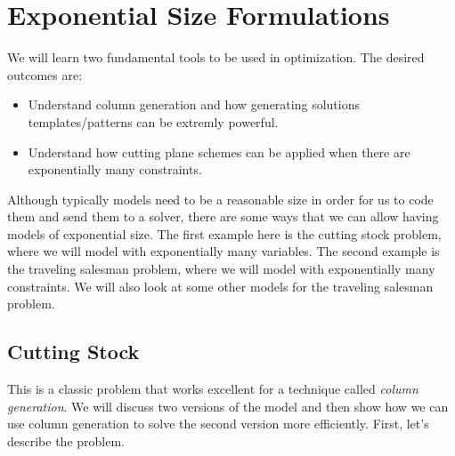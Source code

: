 
%

\chapter{Exponential Size Formulations}
\label{sec:exponential-IP-forumulations}

\begin{outcome}
We will learn two fundamental tools to be used in optimization.  The desired outcomes are:
\begin{itemize}
\item Understand column generation and how generating solutions templates/patterns can be extremly powerful.
\item Understand how cutting plane schemes can be applied when there are exponentially many constraints.
\end{itemize}

\end{outcome}

Although typically models need to be a reasonable size in order for us to code them and send them to a solver, there are some ways that we can allow having models of exponential size.  The first example here is the cutting stock problem, where we will model with exponentially many variables.  The second example is the traveling salesman problem, where we will model with exponentially many constraints.  We will also look at some other models for the traveling salesman problem.  
\section{Cutting Stock}
This is a classic problem that works excellent for a technique called \emph{column generation}.
We will discuss two versions of the model and then show how we can use column generation to solve the second version more efficiently.  First, let's describe the problem.

